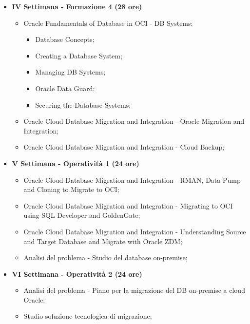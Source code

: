 {\begin{itemize}
        \item \textbf{IV Settimana - Formazione 4 (28 ore)} %
        \begin{itemize}
            \item Oracle Fundamentals of Database in OCI - DB Systems:
            \begin{itemize}
                \item Database Concepts;
                \item Creating a Database System;
                \item Managing DB Systems;
                \item Oracle Data Guard;
                \item Securing the Database Systems;
            \end{itemize} 
            \item Oracle Cloud Database Migration and Integration - Oracle Migration and Integration;
            \item Oracle Cloud Database Migration and Integration - Cloud Backup;
        \end{itemize}

        \item \textbf{V Settimana - Operatività 1 (24 ore)} %
        \begin{itemize}
            \item Oracle Cloud Database Migration and Integration - RMAN, Data Pump and Cloning to Migrate to OCI;
            \item Oracle Cloud Database Migration and Integration - Migrating to OCI using SQL Developer and GoldenGate;  
            \item Oracle Cloud Database Migration and Integration - Understanding Source and Target Database and Migrate with Oracle ZDM; 
            \item Analisi del problema - Studio del database on-premise;
        \end{itemize}

        \item \textbf{VI Settimana - Operatività 2 (24 ore)} %
        \begin{itemize}
            \item Analisi del problema - Piano per la migrazione del DB on-premise a cloud Oracle;
            \item Studio soluzione tecnologica di migrazione;
        \end{itemize}


\end{itemize}}
